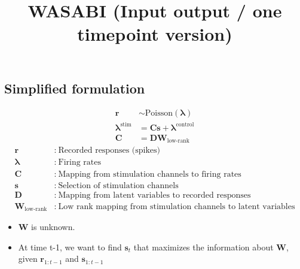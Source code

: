 \documentclass[11pt,letterpaper]{article} %
\title{\vspace{-2.5cm} WASABI (Input output / one timepoint version) \\
  \large  \vspace{-0.4cm}}
\date{\vspace{-0.5cm}}
\begin{document}
\maketitle
\vspace{-0.7cm}
\subsection*{Simplified formulation}
\begin{align*}
\mathbf{r} &\sim \mathrm{Poisson}(\boldsymbol{\lambda}) \\
\boldsymbol{\lambda}^{\mathrm{stim}} &= \mathbf{Cs} + \boldsymbol{\lambda}^{\mathrm{control}} \\
\mathbf{C} &= \mathbf{DW}_{\text{low-rank}}
\end{align*}
\begin{align*}
\mathbf{r} &:\ \text{Recorded responses (spikes)}\\
\boldsymbol{\lambda}  &:\ \text{Firing rates} \\
\mathbf{C} &:\ \text{Mapping from stimulation channels to firing rates} \\
\mathbf{s} &:\ \text{Selection of stimulation channels}\\
\mathbf{D} &:\ \text{Mapping from latent variables to recorded responses} \\
\mathbf{W}_{\text{low-rank}} &:\ \text{Low rank mapping from stimulation channels to latent variables}
\end{align*}

\begin{itemize}
\item $\mathbf{W}$ is unknown.
\item At time t-1, we want to find $\mathbf{s}_t$ that maximizes the information about $\mathbf{W}$, given $\mathbf{r}_{1:t-1}$ and $\mathbf{s}_{1:t-1}$
\end{itemize}

\clearpage
\end{document}
